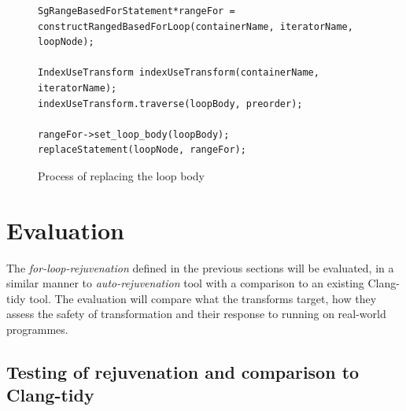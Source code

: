 \documentclass[bsc,frontabs,singlespacing,twoside,parskip,deptreport]{infthesis}
\begin{document}
\begin{figure}[H]
    \centering
    \begin{verbatim}
SgRangeBasedForStatement*rangeFor =
constructRangedBasedForLoop(containerName, iteratorName, loopNode);

IndexUseTransform indexUseTransform(containerName, iteratorName);
indexUseTransform.traverse(loopBody, preorder);

rangeFor->set_loop_body(loopBody);
replaceStatement(loopNode, rangeFor);
    \end{verbatim}
    \caption{Process of replacing the loop body}
    \label{fig:replacing-for-loop-node}
\end{figure}


\section{Evaluation}\label{sec:eval-for-loop}

The \textit{for-loop-rejuvenation} defined in the previous sections will be evaluated, in a similar manner to \textit{auto-rejuvenation} tool with a comparison to an existing Clang-tidy tool. The evaluation will compare what the transforms target, how they assess the safety of transformation and their response to running on real-world programmes.   

\subsection{Testing of rejuvenation and comparison to Clang-tidy}\label{sec:cmp-to-clang-for}
\end{document}
